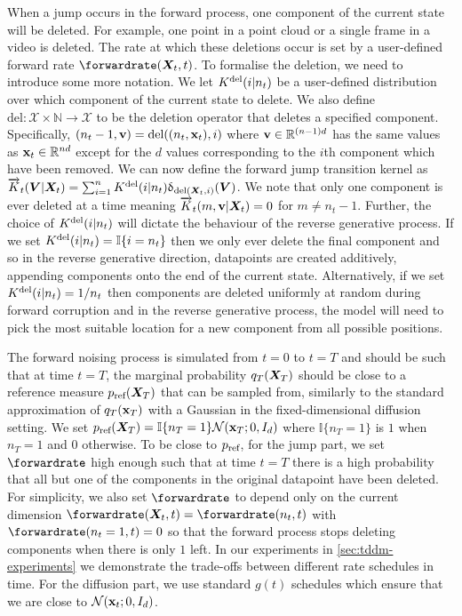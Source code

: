When a jump occurs in the forward process, one component of the current state will be deleted.
For example, one point in a point cloud or a single frame in a video is deleted. The rate at which these deletions occur is set by a user-defined forward rate $\smash{\forwardrate}(\mX_t, t)$. To formalise the deletion, we need to introduce some more notation. We let $K^{\textup{del}}(i | n_t)$ be a user-defined distribution over which component of the current state to delete. We also define $\text{del}: \mathcal{X} \times \mathbb{N} \rightarrow \mathcal{X}$ to be the deletion operator that deletes a specified component. Specifically, $(n_t-1, {\mathbf{v}}) = \text{del}((n_t, {\mathbf{x}}_t), i)$ where ${\mathbf{v}} \in \mathbb{R}^{(n-1)d}$ has the same values as ${\mathbf{x}}_t \in \mathbb{R}^{nd}$ except for the $d$ values corresponding to the $i$th component which have been removed. 
We can now define the forward jump transition kernel as $\overrightarrow{K}_t({\bm{V}} | {\bm{X}}_t) = \sum_{i=1}^n K^{\textup{del}} (i | n_t) \updelta_{\text{del}({\bm{X}}_t, i)}({\bm{V}})$. We note that only one
component is ever deleted at a time meaning $\overrightarrow{K}_t(m, {\mathbf{v}} | {\bm{X}}_t) = 0$ for $m \neq n_t - 1$. Further, the choice of $K^{\textup{del}}(i | n_t)$ will dictate the behaviour of the reverse generative process. If we set $K^{\textup{del}}(i | n_t) = \mathbb{I}\{i=n_t\}$ then we only ever delete the final component and so in the reverse generative direction, datapoints are created additively, appending components onto the end of the current state. Alternatively, if we set $K^{\textup{del}}(i | n_t) = 1/n_t$ then components are deleted uniformly at random during forward corruption and in the reverse generative process, the model will need to pick the most suitable location for a new component from all possible positions.

The forward noising process is simulated from $t=0$ to $t=T$ and should be such that at time $t=T$, the marginal probability $q_T({\bm{X}}_T)$ should be close to a reference measure $p_{\textup{ref}}({\bm{X}}_T)$ that can be sampled from, similarly to the standard approximation of $q_T({\mathbf{x}}_T)$ with a Gaussian in the fixed-dimensional diffusion setting. 
We set $p_{\textup{ref}}({\bm{X}}_T) = \mathbb{I} \{ n_T = 1\} \mathcal{N}({\mathbf{x}}_T; 0, I_{d})$ where $\mathbb{I} \{ n_T = 1\}$ is $1$ when $n_T=1$ and $0$ otherwise. To be close to $p_{\textup{ref}}$, for the jump part, we set $\forwardrate$ high enough such that at time $t=T$ there is a high probability that all but one of the components in the original datapoint have been deleted. For simplicity, we also set $\forwardrate$ to depend only on the current dimension $\forwardrate(\mX_t, t) = \forwardrate(n_t, t)$ with $\forwardrate(n_t=1, t) = 0$ so that the forward process stops deleting components when there is only $1$ left. In our experiments in \cref{sec:tddm-experiments} we demonstrate the trade-offs between different rate schedules in time. For the diffusion part, we use standard $g(t)$ schedules which ensure that we are close to $\mathcal{N}({\mathbf{x}}_t; 0, I_{d})$.

